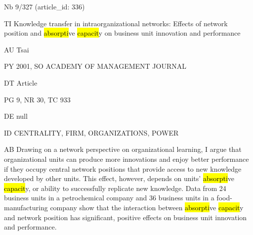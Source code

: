 \documentclass[a4paper]{article}
\begin{document}
\vspace*{-2cm}
Nb \tabto{0cm}9/327 (article\_id: 336)\par
TI \tabto{0cm}Knowledge transfer in intraorganizational networks: Effects of network position and \hl{absorpti}ve \hl{capacit}y on business unit innovation and performance\par
AU \tabto{0cm}Tsai\par
PY \tabto{0cm}2001, SO ACADEMY OF MANAGEMENT JOURNAL\par
DT \tabto{0cm}Article\par
PG \tabto{0cm}9, NR 30, TC 933\par
DE \tabto{0cm}null\par
ID \tabto{0cm}CENTRALITY, FIRM, ORGANIZATIONS, POWER\par
AB \tabto{0cm}Drawing on a network perspective on organizational learning, I argue that organizational units can produce more innovations and enjoy better performance if they occupy central network positions that provide access to new knowledge developed by other units. This effect, however, depends on units' \hl{absorpti}ve \hl{capacit}y, or ability to successfully replicate new knowledge. Data from 24 business units in a petrochemical company and 36 business units in a food-manufacturing company show that the interaction between \hl{absorpti}ve \hl{capacit}y and network position has significant, positive effects on business unit innovation and performance.\par
\clearpage
\end{document}
